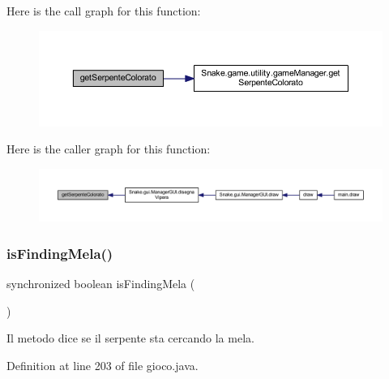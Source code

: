 Here is the call graph for this function\+:
\nopagebreak
\begin{figure}[H]
\begin{center}
\leavevmode
\includegraphics[width=350pt]{class_snake_1_1game_1_1gioco_a8285102d15107685676f4ba0b6029d87_cgraph}
\end{center}
\end{figure}
Here is the caller graph for this function\+:
\nopagebreak
\begin{figure}[H]
\begin{center}
\leavevmode
\includegraphics[width=350pt]{class_snake_1_1game_1_1gioco_a8285102d15107685676f4ba0b6029d87_icgraph}
\end{center}
\end{figure}
\mbox{\label{class_snake_1_1game_1_1gioco_a627e7ff59c6e578230c0e1d99791cb57}} 
\subsubsection{\texorpdfstring{is\+Finding\+Mela()}{isFindingMela()}}
{\footnotesize\ttfamily synchronized boolean is\+Finding\+Mela (\begin{DoxyParamCaption}{ }\end{DoxyParamCaption})}



Il metodo dice se il serpente sta cercando la mela. 



Definition at line 203 of file gioco.\+java.

